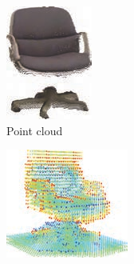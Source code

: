 \begin{figure}[!t]
\begin{subfigure}{0.22\textwidth}
		\includegraphics[width=\linewidth]{Figures/ObjRecog/song_chair_cloud}
		\caption{Point cloud}
		\label{subfig:objrecog:tsdf:cloud}
	\end{subfigure}
	\hfill
	\begin{subfigure}{0.3\textwidth}
		\centering
		\includegraphics[width=\linewidth]{Figures/ObjRecog/song_chair_tsdf}

\end{subfigure}
\end{figure}
